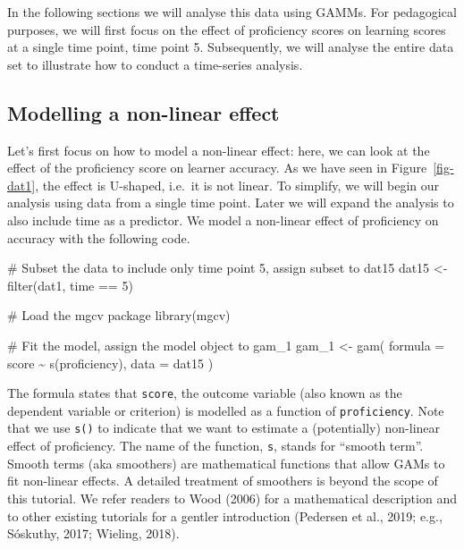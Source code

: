 \documentclass[
  letterpaper,
  DIV=11,
  numbers=noendperiod]{scrartcl}
\newenvironment{Shaded}{\begin{snugshade}}{\end{snugshade}}
\newcommand{\AttributeTok}[1]{\textcolor[rgb]{0.40,0.45,0.13}{#1}}
\newcommand{\CommentTok}[1]{\textcolor[rgb]{0.37,0.37,0.37}{#1}}
\newcommand{\DecValTok}[1]{\textcolor[rgb]{0.68,0.00,0.00}{#1}}
\newcommand{\FunctionTok}[1]{\textcolor[rgb]{0.28,0.35,0.67}{#1}}
\newcommand{\NormalTok}[1]{\textcolor[rgb]{0.00,0.23,0.31}{#1}}
\newcommand{\OtherTok}[1]{\textcolor[rgb]{0.00,0.23,0.31}{#1}}
\newcommand{\SpecialCharTok}[1]{\textcolor[rgb]{0.37,0.37,0.37}{#1}}
\begin{document}
In the following sections we will analyse this data using GAMMs. For
pedagogical purposes, we will first focus on the effect of proficiency
scores on learning scores at a single time point, time point 5.
Subsequently, we will analyse the entire data set to illustrate how to
conduct a time-series analysis.

\subsection{Modelling a non-linear
effect}\label{modelling-a-non-linear-effect}

Let's first focus on how to model a non-linear effect: here, we can look
at the effect of the proficiency score on learner accuracy. As we have
seen in Figure~\ref{fig-dat1}, the effect is U-shaped, i.e.~it is not
linear. To simplify, we will begin our analysis using data from a single
time point. Later we will expand the analysis to also include time as a
predictor. We model a non-linear effect of proficiency on accuracy with
the following code.

\begin{Shaded}
\begin{Highlighting}[]
\CommentTok{\# Subset the data to include only time point 5, assign subset to \textquotesingle{}dat15\textquotesingle{}}
\NormalTok{dat15 }\OtherTok{\textless{}{-}} \FunctionTok{filter}\NormalTok{(dat1, time }\SpecialCharTok{==} \DecValTok{5}\NormalTok{)}

\CommentTok{\# Load the mgcv package}
\FunctionTok{library}\NormalTok{(mgcv)}

\CommentTok{\# Fit the model, assign the model object to \textquotesingle{}gam\_1\textquotesingle{}}
\NormalTok{gam\_1 }\OtherTok{\textless{}{-}} \FunctionTok{gam}\NormalTok{(}
  \AttributeTok{formula =}\NormalTok{ score }\SpecialCharTok{\textasciitilde{}} \FunctionTok{s}\NormalTok{(proficiency),}
  \AttributeTok{data =}\NormalTok{ dat15}
\NormalTok{)}
\end{Highlighting}
\end{Shaded}

The formula states that \texttt{score}, the outcome variable (also known
as the dependent variable or criterion) is modelled as a function of
\texttt{proficiency}. Note that we use \texttt{s()} to indicate that we
want to estimate a (potentially) non-linear effect of proficiency. The
name of the function, \texttt{s}, stands for ``smooth term''. Smooth
terms (aka smoothers) are mathematical functions that allow GAMs to fit
non-linear effects. A detailed treatment of smoothers is beyond the
scope of this tutorial. We refer readers to Wood (2006) for a
mathematical description and to other existing tutorials for a gentler
introduction (Pedersen et al., 2019; e.g., Sóskuthy, 2017; Wieling,
2018).
\end{document}
